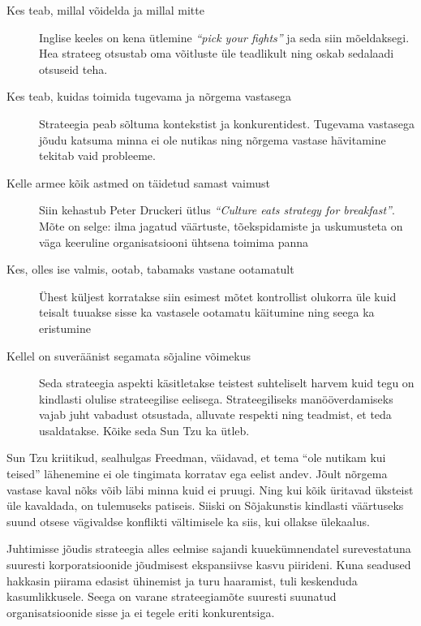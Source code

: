 \begin{description}
	\item[Kes teab, millal võidelda ja millal mitte] Inglise keeles on kena ütlemine \emph{\enquote{pick your fights}} ja seda siin mõeldaksegi. Hea strateeg otsustab oma võitluste üle teadlikult ning oskab sedalaadi otsuseid teha.
	\item[Kes teab, kuidas toimida tugevama ja nõrgema vastasega] Strateegia peab sõltuma kontekstist ja konkurentidest. Tugevama vastasega jõudu katsuma minna ei ole nutikas ning nõrgema vastase hävitamine tekitab vaid probleeme.
	\item[Kelle armee kõik astmed on täidetud samast vaimust] Siin kehastub Peter Druckeri ütlus \emph{\enquote{Culture eats strategy for breakfast}}. Mõte on selge: ilma jagatud väärtuste, tõekspidamiste ja uskumusteta on väga keeruline organisatsiooni ühtsena toimima panna
	\item[Kes, olles ise valmis, ootab, tabamaks vastane ootamatult] Ühest küljest korratakse siin esimest mõtet kontrollist olukorra üle kuid teisalt tuuakse sisse ka vastasele ootamatu käitumine ning seega ka eristumine
	\item[Kellel on suveräänist segamata sõjaline võimekus] Seda strateegia aspekti käsitletakse teistest suhteliselt harvem kuid tegu on kindlasti olulise strateegilise eelisega. Strateegiliseks manööverdamiseks vajab juht vabadust otsustada, alluvate respekti ning teadmist, et teda usaldatakse. Kõike seda Sun Tzu ka ütleb. 
\end{description}

Sun Tzu kriitikud, sealhulgas Freedman, väidavad, et tema \enquote{ole nutikam kui teised} lähenemine ei ole tingimata korratav ega eelist andev. Jõult nõrgema vastase kaval nõks võib läbi minna kuid ei pruugi. Ning kui kõik üritavad üksteist üle kavaldada, on tulemuseks patiseis. Siiski on Sõjakunstis kindlasti väärtuseks suund otsese vägivaldse konflikti vältimisele ka siis, kui ollakse ülekaalus.

Juhtimisse jõudis strateegia alles eelmise sajandi kuuekümnendatel surevestatuna suuresti korporatsioonide jõudmisest ekspansiivse kasvu piirideni. Kuna seadused hakkasin piirama edasist ühinemist ja turu haaramist, tuli keskenduda kasumlikkusele. Seega on varane strateegiamõte suuresti suunatud organisatsioonide sisse ja ei tegele eriti konkurentsiga. 

